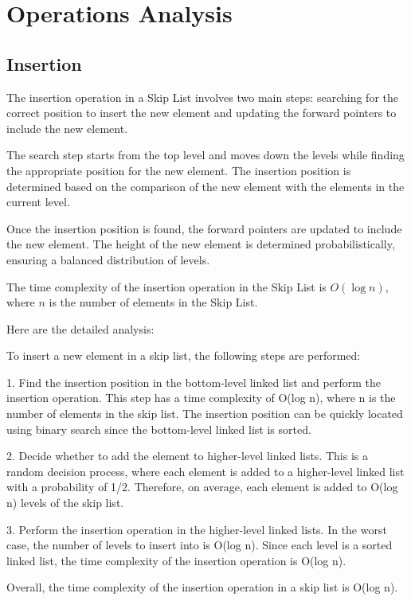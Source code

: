 \documentclass[12pt]{article}
\begin{document}
\section{Operations Analysis}

\subsection{Insertion}
The insertion operation in a Skip List involves two main steps: searching for the correct position to insert the new element and updating the forward pointers to include the new element.

The search step starts from the top level and moves down the levels while finding the appropriate position for the new element. The insertion position is determined based on the comparison of the new element with the elements in the current level.

Once the insertion position is found, the forward pointers are updated to include the new element. The height of the new element is determined probabilistically, ensuring a balanced distribution of levels.

The time complexity of the insertion operation in the Skip List is $O(\log n)$, where $n$ is the number of elements in the Skip List.

Here are the detailed analysis:

To insert a new element in a skip list, the following steps are performed:

1. Find the insertion position in the bottom-level linked list and perform the insertion operation. This step has a time complexity of O(log n), where n is the number of elements in the skip list. The insertion position can be quickly located using binary search since the bottom-level linked list is sorted.

2. Decide whether to add the element to higher-level linked lists. This is a random decision process, where each element is added to a higher-level linked list with a probability of 1/2. Therefore, on average, each element is added to O(log n) levels of the skip list.

3. Perform the insertion operation in the higher-level linked lists. In the worst case, the number of levels to insert into is O(log n). Since each level is a sorted linked list, the time complexity of the insertion operation is O(log n).

Overall, the time complexity of the insertion operation in a skip list is O(log n).
\end{document}
